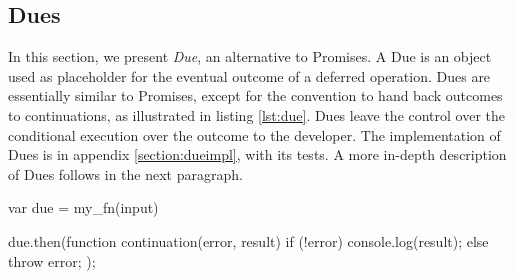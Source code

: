 








\subsection{Dues} \label{section:due}

In this section, we present \textit{Due}, an alternative to Promises.
A Due is an object used as placeholder for the eventual outcome of a deferred operation.
Dues are essentially similar to Promises, except for the convention to hand back outcomes to continuations, as illustrated in listing \ref{lst:due}.
Dues leave the control over the conditional execution over the outcome to the developer.
The implementation of Dues is in appendix \ref{section:dueimpl}, with its tests.
A more in-depth description of Dues follows in the next paragraph.

\begin{code}[js, %
             caption={Example of a due}, %
             label={lst:due}] %
var due = my_fn(input)

due.then(function continuation(error, result) {
  if (!error) {
    console.log(result);
  } else {
    throw error;
  }
});
\end{code}

